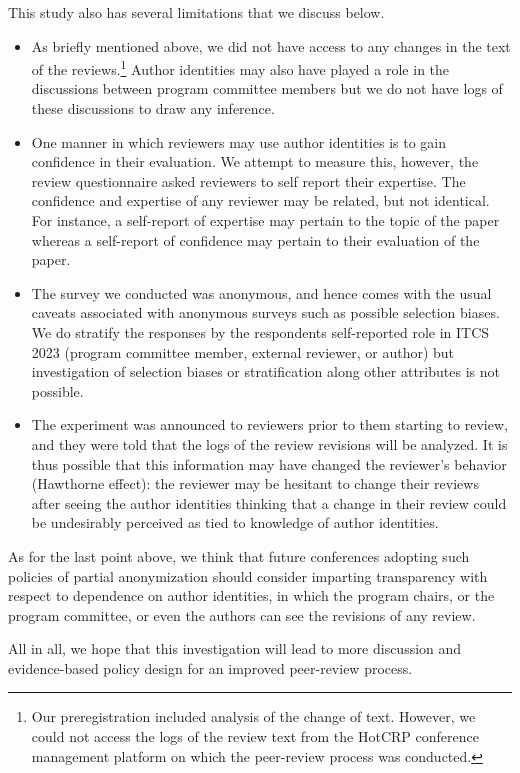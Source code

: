 \documentclass{article}
\newcommand{\rev}[1]{{\color{black}#1}}
\newcommand{\plosfootnote}[1]{\footnote{#1}}
\begin{document}
This study also has several limitations that we discuss below.
\begin{itemize}
    \item As briefly mentioned above, we did not have access to any changes in the text of the reviews.\plosfootnote{Our preregistration included analysis of the change of text. However, we could not access the logs of the review text from the HotCRP conference management platform on which the peer-review process was conducted.} Author identities may also have played a role in the discussions between program committee members but we do not have logs of these discussions to draw any inference.
    \item One manner in which reviewers may use author identities is to gain confidence in their evaluation. We attempt to measure this, however, the review questionnaire asked reviewers to self report their expertise. The confidence and expertise of any reviewer may be related, but not identical. For instance, a self-report of expertise may pertain to the topic of the paper whereas a self-report of confidence may pertain to their evaluation of the paper. 
    \item The survey we conducted was anonymous, and hence comes with the usual caveats associated with anonymous surveys such as possible selection biases. We do stratify the responses by the respondents self-reported role in ITCS 2023 (program committee member, external reviewer, or author) but investigation of selection biases or stratification along other attributes is not possible. 

    \item The experiment was announced to reviewers prior to them starting to review, and they were told that the logs of the review revisions will be analyzed. It is thus possible that this information may have changed the reviewer's behavior (Hawthorne effect): \rev{ the reviewer may be hesitant to change their reviews after seeing the author identities thinking that a change in their review could be undesirably perceived as tied to knowledge of author identities.} 
\end{itemize} 
As for the last point above, we think that future conferences adopting such policies of partial anonymization should consider imparting transparency with respect to dependence on author identities, in which the program chairs, or the program committee, or even the authors can see the revisions of any review. 

All in all, we hope that this investigation will lead to more discussion and evidence-based policy design for an improved peer-review process.
\end{document}
